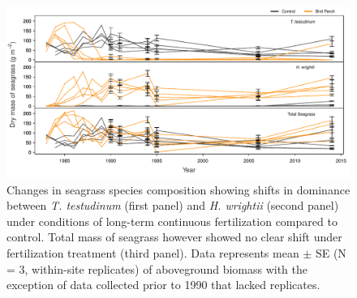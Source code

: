 \begin{figure}
  \centering
  \includegraphics[width=.99\textwidth]{Figures/chapter1/fig1}
\caption[Changes in seagrass species composition showing shifts in dominance between \textit{T. testudinum} (first panel) and \textit{H. wrightii} (second panel) under conditions of long-term continuous fertilization compared to control. Total mass of seagrass however showed no clear shift under fertilization treatment (third panel). Data represents mean $\pm$ SE (N = 3, within-site replicates) of aboveground biomass with the exception of data collected prior to 1990 that lacked replicates]{Changes in seagrass species composition showing shifts in dominance between \textit{T. testudinum} (first panel) and \textit{H. wrightii} (second panel) under conditions of long-term continuous fertilization compared to control. Total mass of seagrass however showed no clear shift under fertilization treatment (third panel). Data represents mean $\pm$ SE (N = 3, within-site replicates) of aboveground biomass with the exception of data collected prior to 1990 that lacked replicates.}
  \label{fig:1fig1}
\end{figure}


